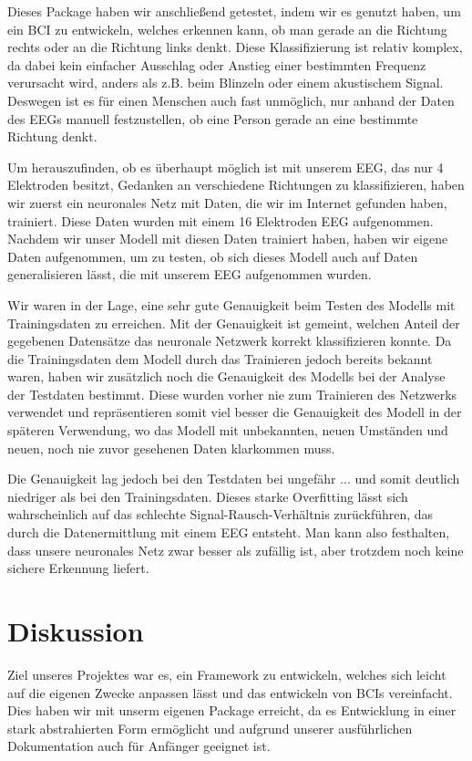 \documentclass[10pt]{article}
\begin{document}
Dieses Package haben wir anschließend getestet, indem wir es genutzt haben, um ein BCI zu entwickeln, welches erkennen kann, ob man gerade an die Richtung rechts oder an die Richtung links denkt. Diese Klassifizierung ist relativ komplex, da dabei kein einfacher Ausschlag oder Anstieg einer bestimmten Frequenz verursacht wird, anders als z.B. beim Blinzeln oder einem akustischem Signal. Deswegen ist es für einen Menschen auch fast unmöglich, nur anhand der Daten des EEGs manuell festzustellen, ob eine Person gerade an eine bestimmte Richtung denkt.

Um herauszufinden, ob es überhaupt möglich ist mit unserem EEG, das nur 4 Elektroden besitzt, Gedanken an verschiedene Richtungen zu klassifizieren, haben wir zuerst ein neuronales Netz mit Daten, die wir im Internet gefunden haben, trainiert. Diese Daten wurden mit einem 16 Elektroden EEG aufgenommen. Nachdem wir unser Modell mit diesen Daten trainiert haben, haben wir eigene Daten aufgenommen, um zu testen, ob sich dieses Modell auch auf Daten generalisieren lässt, die mit unserem EEG aufgenommen wurden.

Wir waren in der Lage, eine sehr gute Genauigkeit beim Testen des Modells mit Trainingsdaten zu erreichen. 
Mit der Genauigkeit ist gemeint, welchen Anteil der gegebenen Datensätze das neuronale Netzwerk korrekt klassifizieren konnte. 
Da die Trainingsdaten dem Modell durch das Trainieren jedoch bereits bekannt waren, haben wir zusätzlich noch die Genauigkeit des Modells bei der Analyse der Testdaten bestimmt. 
Diese wurden vorher nie zum Trainieren des Netzwerks verwendet und repräsentieren somit viel besser die Genauigkeit des Modell in der späteren Verwendung, wo das Modell mit unbekannten, neuen Umständen und neuen, noch nie zuvor gesehenen Daten klarkommen muss. %

Die Genauigkeit lag jedoch bei den Testdaten bei ungefähr ... %
und somit deutlich niedriger als bei den Trainingsdaten. 
Dieses starke Overfitting lässt sich wahrscheinlich auf das schlechte Signal-Rausch-Verhältnis zurückführen, das durch die Datenermittlung mit einem EEG entsteht. Man kann also festhalten, dass unsere neuronales Netz zwar besser als zufällig ist, aber trotzdem noch keine sichere Erkennung liefert.

\section{Diskussion}

Ziel unseres Projektes war es, ein Framework zu entwickeln, welches sich leicht auf die eigenen Zwecke anpassen lässt und das entwickeln von BCIs vereinfacht. Dies haben wir mit unserm eigenen Package erreicht, da es Entwicklung in einer stark abstrahierten Form ermöglicht und aufgrund unserer ausführlichen Dokumentation auch für Anfänger geeignet ist.
\end{document}
